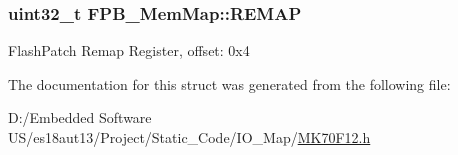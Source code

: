 \subsubsection[{R\+E\+M\+A\+P}]{\setlength{\rightskip}{0pt plus 5cm}uint32\+\_\+t F\+P\+B\+\_\+\+Mem\+Map\+::\+R\+E\+M\+A\+P}\label{struct_f_p_b___mem_map_acdaa312f2de037db4f203b9cfd303772}
Flash\+Patch Remap Register, offset\+: 0x4 

The documentation for this struct was generated from the following file\+:\begin{DoxyCompactItemize}
\item 
D\+:/\+Embedded Software U\+S/es18aut13/\+Project/\+Static\+\_\+\+Code/\+I\+O\+\_\+\+Map/\hyperlink{_m_k70_f12_8h}{M\+K70\+F12.\+h}\end{DoxyCompactItemize}
